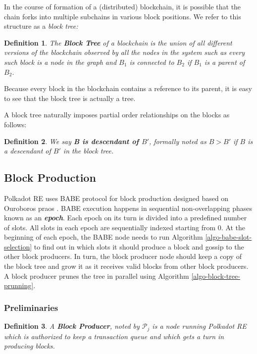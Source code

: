 \documentclass{article}
\newcommand{\tmem}[1]{{\em #1\/}}
\newcommand{\tmstrong}[1]{\textbf{#1}}
\newcommand{\tmtextbf}[1]{{\bfseries{#1}}}
\newcommand{\tmtextit}[1]{{\itshape{#1}}}
\newtheorem{definition}{Definition}
\providecommand{\tmem}[1]{\tmtextit{#1}}
\providecommand{\tmstrong}[1]{\tmtextbf{#1}}
\providecommand{\tmtextbf}[1]{\tmtextbf{#1}}
\providecommand{\tmtextit}[1]{\tmtextit{#1}}
\newtheorem{definition}{Definition}
\begin{document}
In the course of formation of a (distributed) blockchain, it is possible that
the chain forks into multiple subchains in various block positions. We refer
to this structure as a {\tmem{block tree:}}

\begin{definition}
  \label{defn-block-tree}The {\tmstrong{Block Tree}} of a blockchain is the
  union of all different versions of the blockchain observed by all the nodes
  in the system such as every such block is a node in the graph and $B_1$ is
  connected to $B_2$ if $B_1$ is a parent of $B_2$.
\end{definition}

Because every block in the blockchain contains a reference to its parent, it
is easy to see that the block tree is actually a tree.

A block tree naturally imposes partial order relationships on the blocks as
follows:

\begin{definition}
  We say {\tmstrong{B is descendant of $B'$}}, formally noted as {\tmstrong{$B
  > B'$}} if $B$ is a descendant of $B'$ in the block tree.
\end{definition}

\subsection{Block Production}

Polkadot RE uses BABE protocol {\cite{w3f_research_group_blind_2019}} for
block production designed based on Ouroboros praos
{\cite{david_ouroboros_2018}}. BABE execution happens in sequential
non-overlapping phases known as an {\tmstrong{{\tmem{epoch}}}}. Each epoch on
its turn is divided into a predefined number of slots. All slots in each epoch
are sequentially indexed starting from 0. At the beginning of each epoch, the
BABE node needs to run Algorithm \ref{algo-babe-slot-selection} to find out in
which slots it should produce a block and gossip to the other block producers.
In turn, the block producer node should keep a copy of the block tree and grow
it as it receives valid blocks from other block producers. A block producer
prunes the tree in parallel using Algorithm \ref{algo-block-tree-prunning}.

\subsubsection{Preliminaries}

\begin{definition}
  A {\tmstrong{Block Producer}}, noted by $\mathcal{P}_j$ is a node running
  Polkadot RE which is authorized to keep a transaction queue and which gets a
  turn in producing blocks.
\end{definition}
\end{document}
